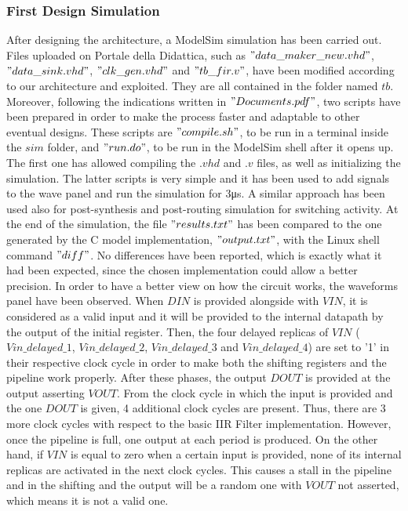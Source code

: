 \subsubsection{First Design Simulation}
After designing the architecture, a ModelSim simulation has been carried out. Files uploaded on Portale della Didattica, such as $"data\_maker\_new.vhd"$, $"data\_sink.vhd"$, $"clk\_gen.vhd"$ and $"tb\_fir.v"$, have been modified according to our architecture and exploited. They are all contained in the folder named $tb$. Moreover, following the indications written in $"Documents.pdf"$, two scripts have been prepared in order to make the process faster and adaptable to other eventual designs. These scripts are $"compile.sh"$, to be run in a terminal inside the $sim$ folder, and $"run.do"$, to be run in the ModelSim shell after it opens up. The first one has allowed compiling the $.vhd$ and $.v$ files, as well as initializing the simulation. The latter scripts is very simple and it has been used to add signals to the wave panel and run the simulation for 3\si{\micro\second}.
A similar approach has been used also for post-synthesis and post-routing simulation for switching activity.
\newline
\newline
At the end of the simulation, the file $"results.txt"$ has been compared to the one generated by the C model implementation, $"output.txt"$, with the Linux shell command $"diff"$. No differences have been reported, which is exactly what it had been expected, since the chosen implementation could allow a better precision.
\newline
\newline
In order to have a better view on how the circuit works, the waveforms panel have been observed. When $DIN$ is provided alongside with $VIN$, it is considered as a valid input and it will be provided to the internal datapath by the output of the initial register. Then, the four delayed replicas of $VIN$ ($Vin\_delayed\_1$, $Vin\_delayed\_2$, $Vin\_delayed\_3$ and $Vin\_delayed\_4$) are set to '1' in their respective clock cycle in order to make both the shifting registers and the pipeline work properly. After these phases, the output $DOUT$ is provided at the output asserting $VOUT$. From the clock cycle in which the input is provided and the one $DOUT$ is given, 4 additional clock cycles are present. Thus, there are 3 more clock cycles with respect to the basic IIR Filter implementation. However, once the pipeline is full, one output at each period is produced.
\newline
\newline
On the other hand, if $VIN$ is equal to zero when a certain input is provided, none of its internal replicas are activated in the next clock cycles. This causes a stall in the pipeline and in the shifting and the output will be a random one with $VOUT$ not asserted, which means it is not a valid one.

